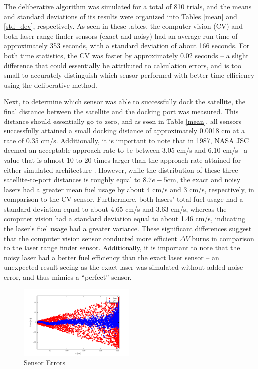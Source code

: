 \documentclass[journal, 10pt]{IEEEtran}
\begin{document}
The deliberative algorithm was simulated for a total of 810 trials, and the means and standard deviations of its results were organized into Tables \ref{mean} and \ref{std_dev}, respectively. As seen in these tables, the computer vision (CV) and both laser range finder sensors (exact and noisy) had an average run time of approximately 353 seconds, with a standard deviation of about 166 seconds. For both time statistics, the CV was faster by approximately 0.02 seconds -- a slight difference that could essentially be attributed to calculation errors, and is too small to accurately distinguish which sensor performed with better time efficiency using the deliberative method. 

Next, to determine which sensor was able to successfully dock the satellite, the final distance between the satellite and the docking port was measured. This distance should essentially go to zero, and as seen in Table \ref{mean}, all sensors successfully attained a small docking distance of approximately 0.0018 cm at a rate of 0.35 cm/s. Additionally, it is important to note that in 1987, NASA JSC deemed an acceptable approach rate to be between 3.05 cm/s and 6.10 cm/s-- a value that is almost 10 to 20 times larger than the approach rate attained for either simulated architecture \cite{approachRate}. However, while the distribution of these three satellite-to-port distances is roughly equal to $8.7e-5$cm, the exact and noisy lasers had a greater mean fuel usage by about 4 cm/s and 3 cm/s, respectively, in comparison to the CV sensor. Furthermore, both lasers' total fuel usage had a standard deviation equal to about 4.65 cm/s and 3.63 cm/s, whereas the computer vision had a standard deviation equal to about 1.46 cm/s, indicating the laser's fuel usage had a greater variance. These significant differences suggest that the computer vision sensor conducted more efficient $\Delta V$ burns in comparison to the laser range finder sensor. Additionally, it is important to note that the noisy laser had a better fuel efficiency than the exact laser sensor -- an unexpected result seeing as the exact laser was simulated without added noise error, and thus mimics a ``perfect'' sensor. 

 \begin{figure}
\begin{center}
\includegraphics[width=0.5\textwidth]{figures/SensorErrors.pdf}
\caption{Sensor Errors}
\label{error}
\end{center}
\end{figure}
\end{document}
